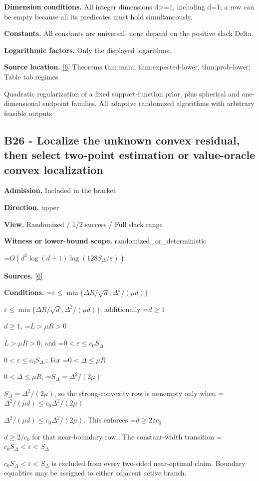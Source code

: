 \documentclass[10pt,a4paper]{article}
\newcommand{\AtlasMath}[1]{\par\begingroup\centering\setbox0=\hbox{$\displaystyle #1$}\ifdim\wd0>1.4\linewidth\typeout{ATLAS WIDE FORMULA: \the\wd0}\fi\ifdim\wd0>\linewidth\resizebox{\linewidth}{!}{\box0}\else\box0\fi\par\endgroup}
\newcommand{\AtlasInlineMath}[1]{\begingroup\setbox0=\hbox{$#1$}\ifdim\wd0>.4\linewidth\endgroup\AtlasMath{#1}\else\endgroup$#1$\fi}
\begin{document}
\textbf{Dimension conditions.} All integer dimensions d>=1, including d=1; a row can be empty because all its predicates must hold simultaneously.



\textbf{Constants.} All constants are universal; none depend on the positive slack Delta.



\textbf{Logarithmic factors.} Only the displayed logarithms.



\textbf{Source location.} \href{https://github.com/WU-Wendao/Colombo/blob/main/colombo_sensorium/Complexity_altas/data/sources/colombo/U10/manuscript.pdf}{[6]} Theorems thm:main, thm:expected-lower, thm:prob-lower; Table tab:regimes



Quadratic regularization of a fixed support-function prior, plus spherical and one-dimensional endpoint families. All adaptive randomized algorithms with arbitrary feasible outputs



\subsection{B26 - Localize the unknown convex residual, then select two-point estimation or value-oracle convex localization}


\textbf{Admission.} Included in the bracket



\textbf{Direction.} upper



\textbf{View.} Randomized / 1/2 success / Full slack range



\textbf{Witness or lower-bound scope.} randomized\_or\_deterministic



\AtlasMath{O\!\left(d^2\log(d+1)\log(128S_\Delta/\varepsilon)\right)}


\textbf{Sources.} \href{https://github.com/WU-Wendao/Colombo/blob/main/colombo_sensorium/Complexity_altas/data/sources/colombo/U10/manuscript.pdf}{[6]}



\textbf{Conditions.} \AtlasInlineMath{\varepsilon\le\min\{\Delta R/\sqrt d,\Delta^2/(\mu d)\}}; additionally \AtlasInlineMath{d\ge1}, \AtlasInlineMath{L>\mu R>0}, and \AtlasInlineMath{0<\varepsilon\le c_0S_\Delta}.; For \AtlasInlineMath{0<\Delta\le\mu R}, \AtlasInlineMath{S_\Delta=\Delta^2/(2\mu)}, so the strong-convexity row is nonempty only when \AtlasInlineMath{\Delta^2/(\mu d)\le c_0\Delta^2/(2\mu)}. This enforces \AtlasInlineMath{d\ge2/c_0} for that near-boundary row.; The constant-width transition \AtlasInlineMath{c_0S_\Delta<\varepsilon<S_\Delta} is excluded from every two-sided near-optimal claim. Boundary equalities may be assigned to either adjacent active branch.
\end{document}
